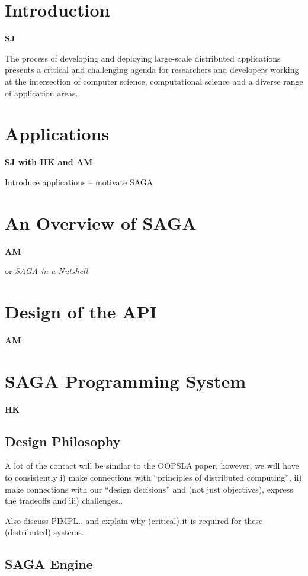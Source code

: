 \documentclass[10pt,letterpaper]{article}
\begin{document}
\section{Introduction} {\bf SJ}

The process of developing and deploying large-scale distributed
applications presents a critical and challenging agenda for
researchers and developers working at the intersection of computer
science, computational science and a diverse range of application
areas. 

\section{Applications}\label{application}{\bf SJ with HK and AM}

Introduce applications -- motivate SAGA

\section{An Overview of SAGA} {\bf AM}

or {\it SAGA in a Nutshell}

\section{Design of the API} {\bf AM}

\section{SAGA Programming System} {\bf HK}


\subsection{Design Philosophy}

A lot of the contact will be similar to the OOPSLA paper, however, we
will have to consistently i) make connections with ``principles of
distributed computing'', ii) make connections with our ``design
decisions'' and (not just objectives), express the tradeoffs and iii)
challenges..

Also discuss PIMPL..  and explain why (critical) it is required
for these (distributed) systems..

\subsection{SAGA Engine}
\end{document}
